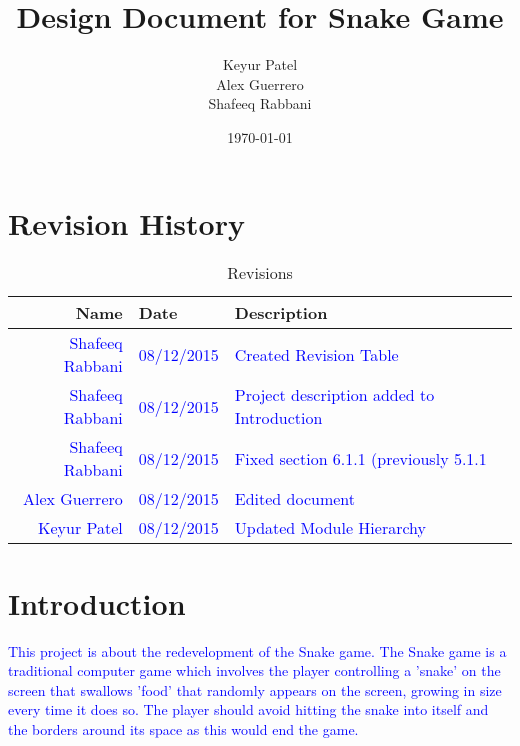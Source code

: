 \documentclass[12pt]{article}
\begin{document}
\title{Design Document for Snake Game} 
\author{Keyur Patel\\ Alex Guerrero\\ Shafeeq Rabbani}
\date{\today}
	
\maketitle

\tableofcontents

\section{Revision History}

\begin{center}
	\begin{longtable}{ | r | p{4cm} | p{10cm} | p{4cm} |}
	\caption{Revisions} \\ \hline \label{TblInputVar} 
	Name & Date & Description\\ \hline
	\textcolor{blue}{Shafeeq Rabbani} & \textcolor{blue}{08/12/2015} &  \textcolor{blue}{Created Revision Table}\\\hline
	\textcolor{blue}{Shafeeq Rabbani} & \textcolor{blue}{08/12/2015} &  \textcolor{blue}{Project description added to Introduction}\\ \hline
	\textcolor{blue}{Shafeeq Rabbani} & \textcolor{blue}{08/12/2015} &  \textcolor{blue}{Fixed section 6.1.1 (previously 5.1.1}\\ \hline
	\textcolor{blue}{Alex Guerrero} & \textcolor{blue}{08/12/2015} &  \textcolor{blue}{Edited document}\\ \hline
	\textcolor{blue}{Keyur Patel} & \textcolor{blue}{08/12/2015} &  \textcolor{blue}{Updated Module Hierarchy}\\ \hline
	\end{longtable}
\end{center}

\section{Introduction}
\textcolor{blue}{This project is about the redevelopment of the Snake game. The Snake game is a traditional computer game which involves the player controlling a 'snake' on the screen that swallows 'food' that randomly appears on the screen, growing in size every time it does so. The player should avoid hitting the snake into itself and the borders around its space as this would end the game. }
\end{document}
